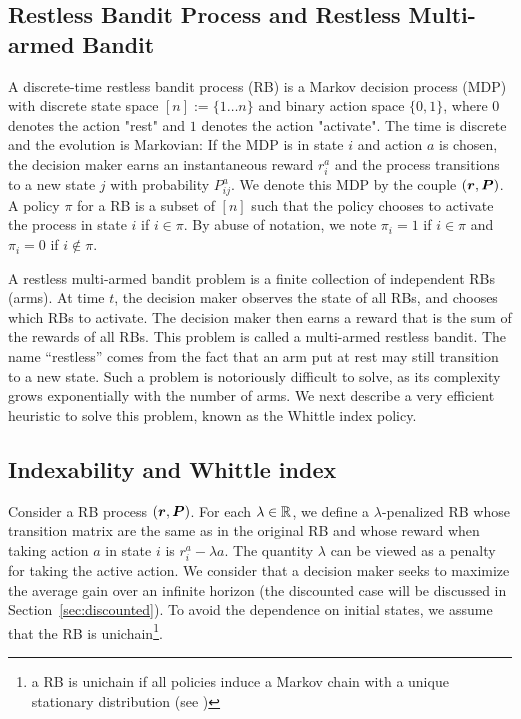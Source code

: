 \documentclass[acmsmall,screen,anonymous]{acmart}
\begin{document}
\subsection{Restless Bandit Process and Restless Multi-armed Bandit}
\label{ssec:def}

A discrete-time restless bandit process (RB) is a Markov decision process (MDP) with discrete state space $[n]:=\{1\dots n\}$ and binary action space $\{0, 1\}$, where $0$ denotes the action "rest" and $1$ denotes the action "activate". The time is discrete and the evolution is Markovian: If the MDP is in state $i$ and action $a$ is chosen, the decision maker earns an instantaneous reward $r^a_i$ and the process transitions to a new state $j$ with probability $P^a_{ij}$. We denote this  MDP by the couple $(\boldsymbol{r},\boldsymbol{P})$.  A policy $\pi$ for a RB is a subset of $[n]$ such that the policy chooses to activate the process in state $i$ if $i\in\pi$. By abuse of notation, we note $\pi_i=1$ if $i\in\pi$ and $\pi_i=0$ if $i\not\in\pi$. 

A restless multi-armed bandit problem is a finite collection of independent RBs (arms). At time $t$, the decision maker observes the state of all RBs, and chooses which RBs to activate. The decision maker then earns a reward that is the sum of the rewards of all RBs. This problem is called a multi-armed restless bandit. The name ``restless'' comes from the fact that an arm put at rest may still transition to a new state. Such a problem is notoriously difficult to solve, as its complexity grows exponentially with the number of arms. We next describe a very efficient heuristic to solve this problem, known as the Whittle index policy.

\subsection{Indexability and Whittle index}

Consider a RB process $(\boldsymbol{r}, \boldsymbol{P})$. For each $\lambda\in\mathbb{R}$, we define a $\lambda$-penalized RB whose transition matrix are the same as in the original RB and whose reward when taking action $a$ in state $i$ is $r^a_i - \lambda a$. The quantity $\lambda$ can be viewed as a penalty for taking the active action. We consider that a decision maker seeks to maximize the average gain over an infinite horizon (the discounted case will be discussed in Section~\ref{sec:discounted}).  To avoid the dependence on initial states, we assume that the RB is unichain\footnote{a RB is unichain if all policies induce a Markov chain with a unique stationary distribution (see \cite{putermanMarkovDecisionProcesses1994})}.
\end{document}
